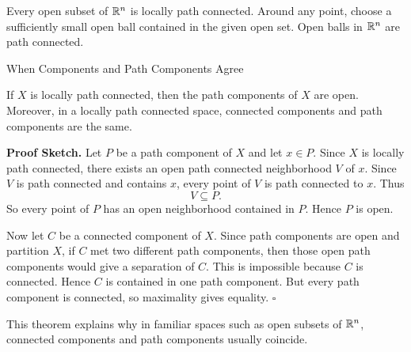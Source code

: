 \documentclass[12pt, a4paper]{article}
\begin{document}
\vspace{300pt}

\begin{problem}
Every open subset of $\mathbb{R}^n$ is locally path connected. Around any point, choose a sufficiently small open ball contained in the given open set. Open balls in $\mathbb{R}^n$ are path connected.
\end{problem}

\clearpage

\begin{heading}
    When Components and Path Components Agree
\end{heading}

\vspace{10pt}

\begin{theorem}
If $X$ is locally path connected, then the path components of $X$ are open. Moreover, in a locally path connected space, connected components and path components are the same.
\end{theorem}

\textbf{Proof Sketch.}
Let $P$ be a path component of $X$ and let $x\in P$. Since $X$ is locally path connected, there exists an open path connected neighborhood $V$ of $x$. Since $V$ is path connected and contains $x$, every point of $V$ is path connected to $x$. Thus
\[
    V\subseteq P.
\]
So every point of $P$ has an open neighborhood contained in $P$. Hence $P$ is open.

Now let $C$ be a connected component of $X$. Since path components are open and partition $X$, if $C$ met two different path components, then those open path components would give a separation of $C$. This is impossible because $C$ is connected. Hence $C$ is contained in one path component. But every path component is connected, so maximality gives equality. \hfill $\square$

\vfill

\begin{problem}
This theorem explains why in familiar spaces such as open subsets of $\mathbb{R}^n$, connected components and path components usually coincide.
\end{problem}

\clearpage



\EndPage
\end{document}
